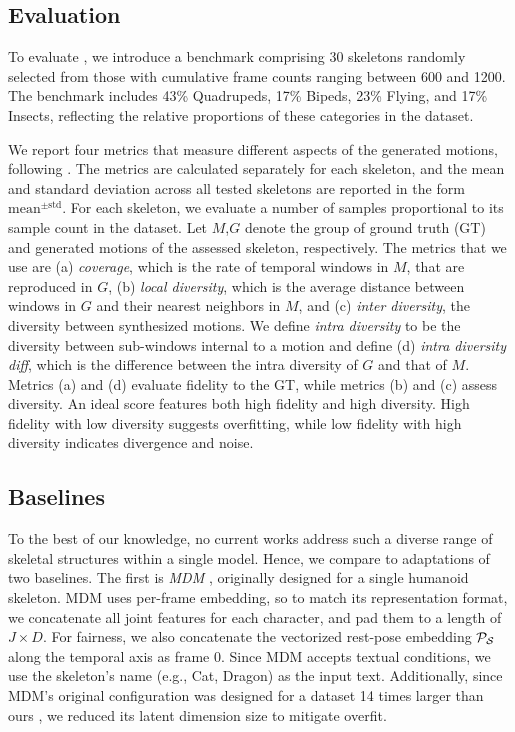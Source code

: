 \subsection{Evaluation}
To evaluate \algoname, we introduce a benchmark comprising 30 skeletons randomly selected from those with cumulative frame counts ranging between 600 and 1200. The benchmark includes 43\% Quadrupeds, 17\% Bipeds, 23\% Flying, and 17\% Insects,  reflecting the relative proportions of these categories in the dataset. 

We report four metrics that measure different aspects of the generated motions, following \citet{raab2024single,li2022ganimator}. 
The metrics are calculated separately for each skeleton, and the mean and standard deviation across all tested skeletons are reported in the form \emph{$\text{mean}^{\pm\text{std}}$}. For each skeleton, we evaluate a number of samples proportional to its sample count in the dataset.
Let $M$,$G$ denote the group of ground truth (GT) and generated motions of the assessed skeleton, respectively. The metrics that we use are 
(a) \emph{coverage}, which is the rate of temporal windows in $M$, that are reproduced in $G$, (b) \emph{local diversity}, which is the average distance between windows in $G$ and their nearest neighbors in $M$, and (c) \emph{inter diversity}, the diversity between synthesized motions.
We define \emph{intra diversity} to be the diversity between sub-windows internal to a motion and define (d) \emph{intra diversity diff}, which is the difference between the intra diversity of $G$ and that of $M$.
Metrics (a) and (d) evaluate fidelity to the GT, while metrics (b) and (c) assess diversity. 
An ideal score features both high fidelity and high diversity.
High fidelity with low diversity suggests overfitting, while low fidelity with high diversity indicates divergence and noise.




\subsection{Baselines} 
To the best of our knowledge, no current works address such a diverse range of skeletal structures within a single model. Hence, we compare \algoname to adaptations of two baselines. The first is \emph{MDM} \cite{tevet2023human}, originally designed for a single humanoid skeleton. 
MDM uses per-frame embedding, so to match its representation format, we concatenate all joint features for each character, and pad them to a length of $J \times D$.
For fairness, we also concatenate the vectorized rest-pose embedding $\mathcal{P}_{\mathcal{S}}$ along the temporal axis as frame 0. Since MDM accepts textual conditions, we use the skeleton's name (e.g., Cat, Dragon) as the input text.
Additionally, since MDM's original configuration was designed for a dataset 14 times larger than ours \cite{Guo_2022_CVPR}, we reduced its latent dimension size to mitigate overfit.

